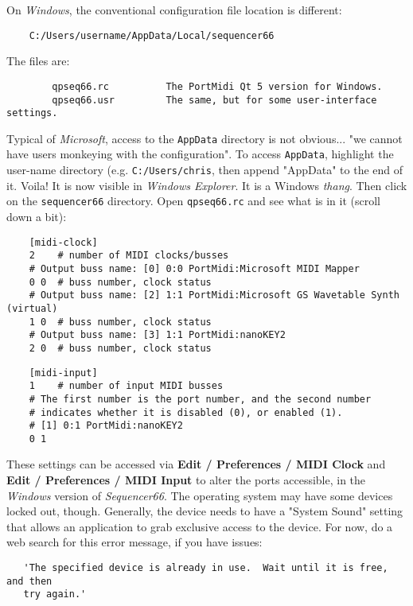     On \textsl{Windows}, the conventional configuration file
    location is different:
    
\begin{verbatim}
    C:/Users/username/AppData/Local/sequencer66
\end{verbatim}

    The files are:

\begin{verbatim}
        qpseq66.rc          The PortMidi Qt 5 version for Windows.
        qpseq66.usr         The same, but for some user-interface settings.
\end{verbatim}

    Typical of \textsl{Microsoft}, access to the \texttt{AppData} directory
    is not obvious... "we cannot have users monkeying with the configuration".
    To access \texttt{AppData}, highlight the user-name directory
    (e.g. \texttt{C:/Users/chris}, then append
    "AppData" to the end of it.  Voila! It is now visible in
    \textsl{Windows Explorer}.
    It is a Windows \textsl{thang}.
    Then click on the \texttt{sequencer66} directory.
    Open \texttt{qpseq66.rc} and see what is in it (scroll down a bit):

\begin{verbatim}
    [midi-clock]
    2    # number of MIDI clocks/busses
    # Output buss name: [0] 0:0 PortMidi:Microsoft MIDI Mapper
    0 0  # buss number, clock status
    # Output buss name: [2] 1:1 PortMidi:Microsoft GS Wavetable Synth (virtual)
    1 0  # buss number, clock status
    # Output buss name: [3] 1:1 PortMidi:nanoKEY2
    2 0  # buss number, clock status
\end{verbatim}
    
\begin{verbatim}
    [midi-input]
    1    # number of input MIDI busses
    # The first number is the port number, and the second number
    # indicates whether it is disabled (0), or enabled (1).
    # [1] 0:1 PortMidi:nanoKEY2
    0 1
\end{verbatim}

   These settings can be accessed via
   \textbf{Edit / Preferences / MIDI Clock} and
   \textbf{Edit / Preferences / MIDI Input} to
	alter the ports accessible, in the \textsl{Windows}
   version of \textsl{Sequencer66}.
   The operating system may have some devices locked out, though.
   Generally, the device needs to have a "System Sound" setting that allows an
   application to grab exclusive access to the device.
   For now, do a web search for this error message, if you have issues:

\begin{verbatim}
   'The specified device is already in use.  Wait until it is free, and then
   try again.'
\end{verbatim}

